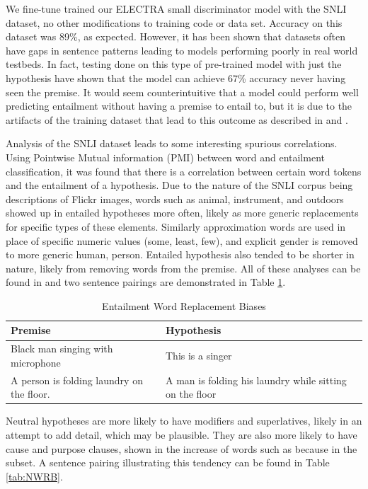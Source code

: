 \documentclass[11pt]{article}
\begin{document}
We fine-tune trained our ELECTRA small discriminator model with the SNLI dataset, no other modifications to training code or data set.  Accuracy on this dataset was 89\%, as expected. However, it has been shown that datasets often have gaps in sentence patterns leading to models performing poorly in real world testbeds. In fact, testing done on this type of pre-trained model with just the hypothesis have shown that the model can achieve 67\% accuracy never having seen the premise.  It would seem counterintuitive that a model could perform well predicting entailment without having a premise to entail to, but it is due to the artifacts of the training dataset that lead to this outcome as described in  \citealp{princeton} and \citealp{premise4granted}.

Analysis of the SNLI dataset leads to some interesting spurious correlations. Using Pointwise Mutual information (PMI) between word and entailment classification, it was found that there is a correlation between certain word tokens and the entailment of a hypothesis. Due to the nature of the SNLI corpus being descriptions of Flickr images, words such as animal, instrument, and outdoors showed up in entailed hypotheses more often, likely as more generic replacements for specific types of these elements. Similarly approximation words are used in place of specific numeric values (some, least, few), and explicit gender is removed to more generic human, person. Entailed hypothesis also tended to be shorter in nature, likely from removing words from the premise. All of these analyses can be found in \citealp{princeton} and two sentence pairings are demonstrated in Table \ref{tab:EWRB}.
\begin{table}[!ht]
    \centering
    \begin{tabularx}{0.45\textwidth} { 
  | >{\raggedright\arraybackslash}X 
  | >{\raggedright\arraybackslash}X | }
    \hline
    Premise & Hypothesis \\
    \hline\hline
        Black man singing with microphone & This is a singer \\
        \hline
        A person is folding laundry on the floor. & A man is folding his laundry while sitting on the floor \\
        \hline
    \end{tabularx}
    \caption{Entailment Word Replacement Biases}
    \label{tab:EWRB}
\end{table}

Neutral hypotheses are more likely to have modifiers and superlatives, likely in an attempt to add detail, which may be plausible.  They are also more likely to have cause and purpose clauses, shown in the increase of words such as because in the subset.  A sentence pairing illustrating this tendency can be found in Table \ref{tab:NWRB}.
\end{document}
